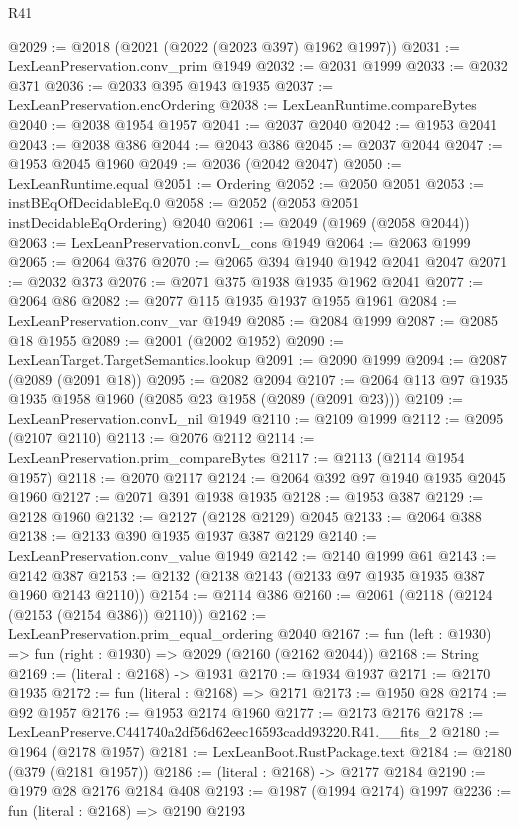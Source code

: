 \begin{lexlean}{R41}
\begin{coremodule}
@2029 := @2018 (@2021 (@2022 (@2023 @397) @1962 @1997))
@2031 := LexLeanPreservation.conv_prim @1949
@2032 := @2031 @1999
@2033 := @2032 @371
@2036 := @2033 @395 @1943 @1935
@2037 := LexLeanPreservation.encOrdering
@2038 := LexLeanRuntime.compareBytes
@2040 := @2038 @1954 @1957
@2041 := @2037 @2040
@2042 := @1953 @2041
@2043 := @2038 @386
@2044 := @2043 @386
@2045 := @2037 @2044
@2047 := @1953 @2045 @1960
@2049 := @2036 (@2042 @2047)
@2050 := LexLeanRuntime.equal
@2051 := Ordering
@2052 := @2050 @2051
@2053 := instBEqOfDecidableEq.{0}
@2058 := @2052 (@2053 @2051 instDecidableEqOrdering) @2040
@2061 := @2049 (@1969 (@2058 @2044))
@2063 := LexLeanPreservation.convL_cons @1949
@2064 := @2063 @1999
@2065 := @2064 @376
@2070 := @2065 @394 @1940 @1942 @2041 @2047
@2071 := @2032 @373
@2076 := @2071 @375 @1938 @1935 @1962 @2041
@2077 := @2064 @86
@2082 := @2077 @115 @1935 @1937 @1955 @1961
@2084 := LexLeanPreservation.conv_var @1949
@2085 := @2084 @1999
@2087 := @2085 @18 @1955
@2089 := @2001 (@2002 @1952)
@2090 := LexLeanTarget.TargetSemantics.lookup
@2091 := @2090 @1999
@2094 := @2087 (@2089 (@2091 @18))
@2095 := @2082 @2094
@2107 := @2064 @113 @97 @1935 @1935 @1958 @1960 (@2085 @23 @1958 (@2089 (@2091 @23)))
@2109 := LexLeanPreservation.convL_nil @1949
@2110 := @2109 @1999
@2112 := @2095 (@2107 @2110)
@2113 := @2076 @2112
@2114 := LexLeanPreservation.prim_compareBytes
@2117 := @2113 (@2114 @1954 @1957)
@2118 := @2070 @2117
@2124 := @2064 @392 @97 @1940 @1935 @2045 @1960
@2127 := @2071 @391 @1938 @1935
@2128 := @1953 @387
@2129 := @2128 @1960
@2132 := @2127 (@2128 @2129) @2045
@2133 := @2064 @388
@2138 := @2133 @390 @1935 @1937 @387 @2129
@2140 := LexLeanPreservation.conv_value @1949
@2142 := @2140 @1999 @61
@2143 := @2142 @387
@2153 := @2132 (@2138 @2143 (@2133 @97 @1935 @1935 @387 @1960 @2143 @2110))
@2154 := @2114 @386
@2160 := @2061 (@2118 (@2124 (@2153 (@2154 @386)) @2110))
@2162 := LexLeanPreservation.prim_equal_ordering @2040
@2167 := fun (left : @1930) => fun (right : @1930) => @2029 (@2160 (@2162 @2044))
@2168 := String
@2169 := (literal : @2168) -> @1931
@2170 := @1934 @1937
@2171 := @2170 @1935
@2172 := fun (literal : @2168) => @2171
@2173 := @1950 @28
@2174 := @92 @1957
@2176 := @1953 @2174 @1960
@2177 := @2173 @2176
@2178 := LexLeanPreserve.C441740a2df56d62eec16593cadd93220.R41.__fits_2
@2180 := @1964 (@2178 @1957)
@2181 := LexLeanBoot.RustPackage.text
@2184 := @2180 (@379 (@2181 @1957))
@2186 := (literal : @2168) -> @2177 @2184
@2190 := @1979 @28 @2176 @2184 @408
@2193 := @1987 (@1994 @2174) @1997
@2236 := fun (literal : @2168) =>
  @2190
    @2193

\end{coremodule}
\end{lexlean}
